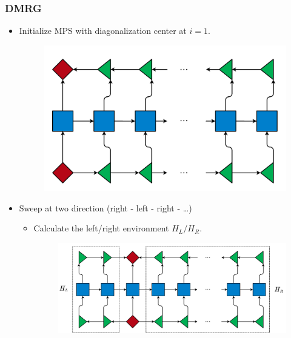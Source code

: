 \documentclass{beamer}
\begin{document}
\begin{frame}
	\frametitle{DMRG}
	\begin{multicols*}{2}
	\begin{itemize}
		\item Initialize MPS with diagonalization center at $i=1$.
		\begin{figure}[H]
			\includegraphics[width=1. \linewidth]{images/Initialization.pdf}
		\end{figure}
		\newpage
		\item Sweep at two direction (right - left - right - \dots)
		\begin{itemize}
			\item Calculate the left/right environment $H_L/H_R$.
			\begin{figure}[H]
				\includegraphics[width=1. \linewidth]{images/LRenv1.pdf}
			\end{figure}
		\end{itemize}
	\end{itemize}
	\end{multicols*}
\end{frame}
\end{document}
